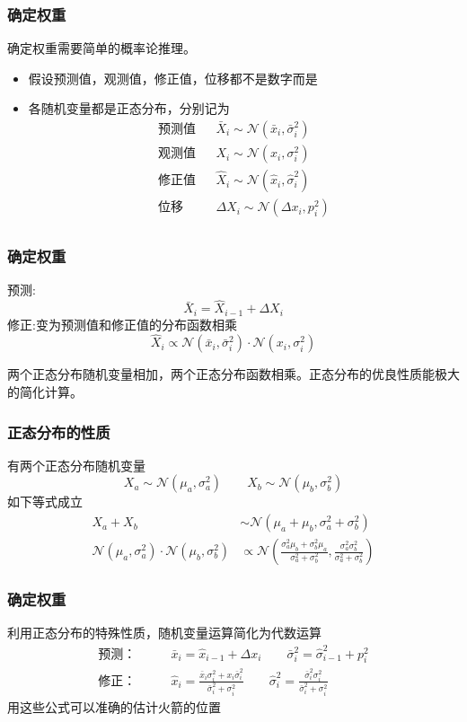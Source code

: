 \documentclass[14pt]{beamer}
\newcommand{\DN}{\mathcal{N}}
\let\emph\relax %
\begin{document}
\begin{frame}
  \frametitle{确定权重}
  确定权重需要简单的概率论推理。
  \begin{itemize}
    \item 假设预测值，观测值，修正值，位移都不是数字而是\emph{随机变量}
    \item 各随机变量都是正态分布，分别记为
    \begin{equation*}
      \begin{array}{rll}
        \text{预测值} && \bar{X}_i\sim \DN(\bar{x}_i, \bar{\sigma}_i^2)\\
        \text{观测值} && X_i\sim \DN(x_i, \sigma_i^2)\\
        \text{修正值} && \hat{X}_i\sim \DN(\hat{x}_i, \hat{\sigma}_i^2)\\
        \text{位移} && \Delta X_i\sim \DN(\Delta x_i, p_i^2)\\
      \end{array}
    \end{equation*}
  \end{itemize}
\end{frame}

\begin{frame}
  \frametitle{确定权重}
  预测:
  $$\bar{X}_i=\hat{X}_{i-1}+\Delta X_i$$
  修正:变为预测值和修正值的分布函数相乘
  $$\hat{X}_i\propto\DN(\bar{x}_i, \bar{\sigma}_i^2)\cdot
  \DN(x_i, \sigma_i^2)$$

  两个正态分布随机变量相加，两个正态分布函数相乘。正态分布的优良性质能极大的简化计算。
\end{frame}

\begin{frame}
  \frametitle{正态分布的性质}
  有两个正态分布随机变量
  $$X_a\sim\DN(\mu_a, \sigma_a^2)\qquad X_b\sim\DN(\mu_b, \sigma_b^2)$$
  如下等式成立
  \begin{align*}
    X_a+X_b&\sim \DN(\mu_a+\mu_b,\sigma_a^2+\sigma_b^2)\\
    \DN(\mu_a, \sigma_a^2)\cdot\DN(\mu_b, \sigma_b^2)&\propto
    \DN(\frac{\sigma_a^2\mu_b+\sigma_b^2\mu_a}{\sigma_a^2+\sigma_b^2},
    \frac{\sigma_a^2\sigma_b^2}{\sigma_a^2+\sigma_b^2})
  \end{align*}
\end{frame}

\begin{frame}
  \frametitle{确定权重}
  利用正态分布的特殊性质，随机变量运算简化为代数运算
  \begin{align*}
    \text{预测：}&\qquad\bar{x}_i = \hat{x}_{i-1}+\Delta x_i\qquad 
    \bar{\sigma}_i^2=\hat{\sigma}_{i-1}^2+p_i^2\\
    \text{修正：}&\qquad\hat{x}_i = \frac{\bar{x}_i\sigma_i^2+x_i\bar{\sigma}_i^2}
    {\bar{\sigma}_i^2+\sigma_i^2}\qquad\hat{\sigma}_i^2=
    \frac{\bar{\sigma}_i^2\sigma_i^2}{\bar{\sigma}_i^2+\sigma_i^2}
  \end{align*}
  用这些公式可以准确的估计火箭的位置
\end{frame}
\end{document}
